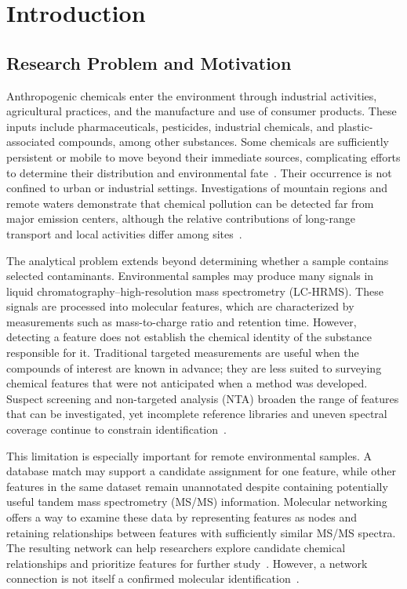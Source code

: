 \chapter{Introduction}\label{intro}


\section{Research Problem and Motivation}\label{sec:research-problem}
    Anthropogenic chemicals enter the environment through industrial activities, agricultural practices, and the manufacture and use of consumer products. These inputs include pharmaceuticals, pesticides, industrial chemicals, and plastic-associated compounds, among other substances. Some chemicals are sufficiently persistent or mobile to move beyond their immediate sources, complicating efforts to determine their distribution and environmental fate~\cite{Manz2023,Blais2015,Wilkinson2022}. Their occurrence is not confined to urban or industrial settings. Investigations of mountain regions and remote waters demonstrate that chemical pollution can be detected far from major emission centers, although the relative contributions of long-range transport and local activities differ among sites~\cite{Daly2005,Xu2011,Ma2025}.

    The analytical problem extends beyond determining whether a sample contains selected contaminants. Environmental samples may produce many signals in liquid chromatography--high-resolution mass spectrometry (LC-HRMS). These signals are processed into molecular features, which are characterized by measurements such as mass-to-charge ratio and retention time. However, detecting a feature does not establish the chemical identity of the substance responsible for it. Traditional targeted measurements are useful when the compounds of interest are known in advance; they are less suited to surveying chemical features that were not anticipated when a method was developed. Suspect screening and non-targeted analysis (NTA) broaden the range of features that can be investigated, yet incomplete reference libraries and uneven spectral coverage continue to constrain identification~\cite{Manz2023,Schulze2020,Hupatz2025}.

    This limitation is especially important for remote environmental samples. A database match may support a candidate assignment for one feature, while other features in the same dataset remain unannotated despite containing potentially useful tandem mass spectrometry (MS/MS) information. Molecular networking offers a way to examine these data by representing features as nodes and retaining relationships between features with sufficiently similar MS/MS spectra. The resulting network can help researchers explore candidate chemical relationships and prioritize features for further study~\cite{Wang2016,Nothias2020,Bittremieux2022}. However, a network connection is not itself a confirmed molecular identification~\cite{Schymanski2014}.

